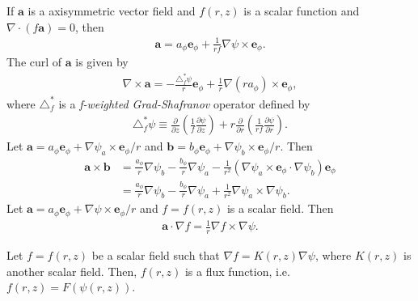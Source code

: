\documentclass[reqno]{amsart}
\newcommand{\pfrac}[2]{\frac{\partial #1}{\partial #2}}
\newcommand{\mvec}[1]{\mathbf{#1}}
\newcommand{\eep}{\mvec{e}_\phi}
\theoremstyle{definition}
\begin{document}
If $\mvec{a}$ is a axisymmetric vector field and $f(r,z)$ is a
scalar function and $\nabla \cdot (f\mvec{a}) = 0$, then
\begin{align}
  \mvec{a} = a_\phi \eep + \frac{1}{rf}\nabla\psi \times \eep.
\end{align}
The curl of $\mvec{a}$ is given by
\begin{align}
  \nabla\times\mvec{a} = -\frac{\triangle^*_f\psi}{r}\eep
  + \frac{1}{r} \nabla(ra_\phi)\times\eep, \label{eq:curlaf}
\end{align}
where $\triangle^*_f$ is a \emph{f-weighted Grad-Shafranov} operator
defined by
\begin{align}
  \triangle^*_f\psi \equiv 
  \frac{\partial}{\partial z}\left(\frac{1}{f} \pfrac{\psi}{z}\right)
  + r \frac{\partial}{\partial r}\left(\frac{1}{rf} \pfrac{\psi}{r}\right).
\end{align}
Let $\mvec{a}=a_\phi\eep + \nabla\psi_a \times \eep/r$ and $\mvec{b}=b_\phi\eep +
\nabla\psi_b \times \eep/r$. Then 
\begin{align}
  \mvec{a}\times\mvec{b} &=
  \frac{a_\phi}{r}\nabla\psi_b
  -
  \frac{b_\phi}{r}\nabla\psi_a
  -\frac{1}{r^2}(\nabla\psi_a \times \eep \cdot \nabla\psi_b)\eep \\
  &= \frac{a_\phi}{r}\nabla\psi_b
  -
  \frac{b_\phi}{r}\nabla\psi_a
  +\frac{1}{r^2}\nabla\psi_a \times \nabla\psi_b.
\end{align}
Let $\mvec{a}=a_\phi\eep + \nabla\psi \times \eep/r$ and $f=f(r,z)$ is
a scalar field. Then
\begin{align}
  \mvec{a}\cdot\nabla f = \frac{1}{r} \nabla f \times \nabla{\psi}.
\end{align}

Let $f=f(r,z)$ be a scalar field such that $\nabla f = K(r,z) \nabla
\psi$, where $K(r,z)$ is another scalar field. Then, $f(r,z)$ is a
flux function, i.e. $f(r,z) = F(\psi(r,z))$.
\end{document}
